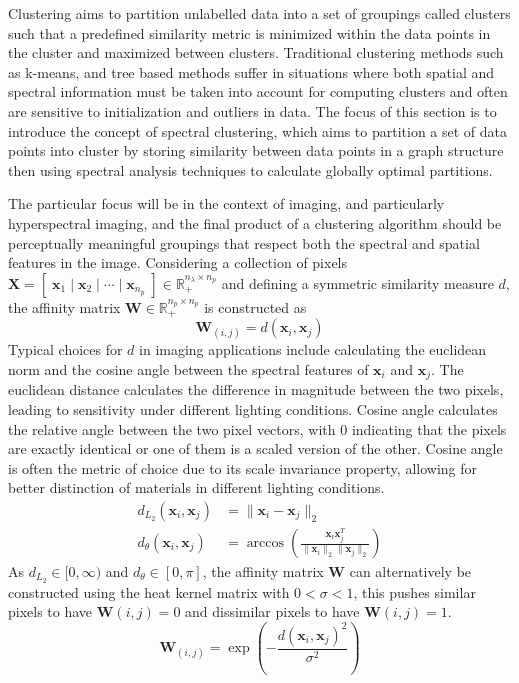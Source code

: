 Clustering aims to partition unlabelled data into a set of groupings called clusters such that a predefined similarity metric is minimized within the data points in the cluster and maximized between clusters. Traditional clustering methods such as k-means, and tree based methods suffer in situations where both spatial and spectral information must be taken into account for computing clusters and often are sensitive to initialization and outliers in data. The focus of this section is to introduce the concept of spectral clustering, which aims to partition a set of data points into cluster by storing similarity between data points in a graph structure then using spectral analysis techniques to calculate globally optimal partitions. 

The particular focus will be in the context of imaging, and particularly hyperspectral imaging, and the final product of a clustering algorithm should be perceptually meaningful groupings that respect both the spectral and spatial features in the image. Considering a collection of pixels $\mathbf{X} = [\; \mathbf{x}_1 \;|\; \mathbf{x}_2 \;|\; \cdots \;|\; \mathbf{x}_{n_p} \;] \in \mathbb{R}_ +^{n_\lambda \times n_p}$ and defining a symmetric similarity measure $d$, the affinity matrix $\mathbf{W} \in \mathbb{R}_ +^{n_p \times n_p}$ is constructed as
\begin{equation}
    \label{sc:affinity-mtx}
    \mathbf{W}_{(i,j)} = d(\mathbf{x}_i, \mathbf{x}_j) 
\end{equation}
Typical choices for $d$ in imaging applications include calculating the euclidean norm and the cosine angle between the spectral features of $\mathbf{x}_i$ and $\mathbf{x}_j$. The euclidean distance calculates the difference in magnitude between the two pixels, leading to sensitivity under different lighting conditions. Cosine angle calculates the relative angle between the two pixel vectors, with $0$ indicating that the pixels are exactly identical or one of them is a scaled version of the other. Cosine angle is often the metric of choice due to its scale invariance property, allowing for better distinction of materials in different lighting conditions.
\begin{equation}
    \label{sc:affinity-measures}
    \begin{aligned}
        d_{L_2}(\mathbf{x}_i, \mathbf{x}_j) &= \| \mathbf{x}_i -\mathbf{x}_j \|_2
        \\
        d_{\theta}(\mathbf{x}_i, \mathbf{x}_j) &= \arccos\left(\frac{\mathbf{x}_i\mathbf{x}_j^T }{\|\mathbf{x}_i\|_2\|\mathbf{x}_j\|_2}\right)
    \end{aligned}
\end{equation}
As $d_{L_2} \in [0,\infty)$ and $d_\theta \in [0, \pi]$, the affinity matrix $\mathbf{W}$ can alternatively be constructed using the heat kernel matrix with $0 < \sigma < 1$, this pushes similar pixels to have $\mathbf{W}(i,j) = 0$ and dissimilar pixels to have $\mathbf{W}(i,j) = 1$. 
\begin{equation}
    \label{sc:affinity-type-2}
    \mathbf{W}_{(i,j)} = \exp\left(-\frac{d(\mathbf{x}_i,\mathbf{x}_j)^2}{\sigma^2}\right) 
\end{equation}

